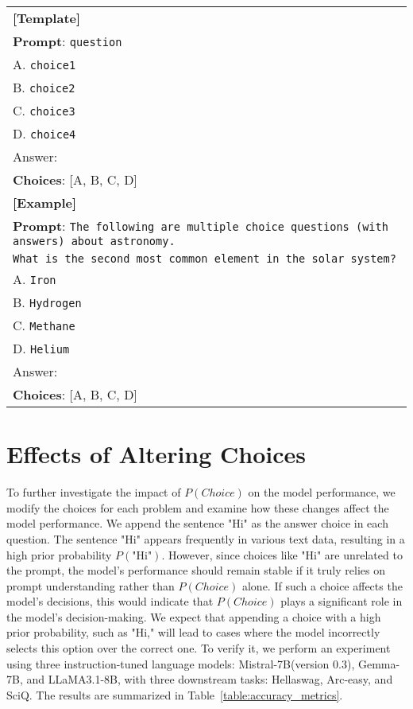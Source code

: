 \begin{table}[H]
\centering
\begin{small}
\begin{tabular}{|p{7cm}|}
\hline
\textbf{[Template]} \\
\textbf{Prompt}: \texttt{question}\\
A. \texttt{choice1} \\
B. \texttt{choice2} \\
C. \texttt{choice3} \\
D. \texttt{choice4} \\
Answer: \\
\textbf{Choices}: [A, B, C, D] \\
\hline \textbf{[Example]} \\
\textbf{Prompt}: \texttt{The following are multiple choice questions (with answers) about astronomy.}\\ \texttt{What is the second most common element in the solar system?}\\A. \texttt{Iron}\\B. \texttt{Hydrogen}\\C. \texttt{Methane}\\D. \texttt{Helium}\\Answer: \\
\textbf{Choices}: [A, B, C, D] \\ \hline
\end{tabular}
\end{small}
\end{table}


\section{Effects of Altering Choices}
\label{sec:hi_experiment}

{To further investigate the impact of {\small $P(Choice)$} on the model performance, we modify the choices for each problem and examine how these changes affect the model performance. 
We append the sentence "Hi" as the answer choice in each question. The sentence "Hi" appears frequently in various text data, resulting in a high prior probability \mbox{$P(\text{"Hi"})$}. However, since choices like "Hi" are unrelated to the prompt, the model's performance should remain stable if it truly relies on prompt understanding rather than \mbox{{\small $P(Choice)$}} alone. If such a choice affects the model's decisions, this would indicate that \mbox{\small $P(Choice)$} plays a significant role in the model's decision-making. We expect that appending a choice with a high prior probability, such as "Hi," will lead to cases where the model incorrectly selects this option over the correct one. To verify it, we perform an experiment using three instruction-tuned language models: Mistral-7B(version 0.3), Gemma-7B, and LLaMA3.1-8B, with three downstream tasks: Hellaswag, Arc-easy, and SciQ. The results are summarized in Table\mbox{~\ref{table:accuracy_metrics}}.}

